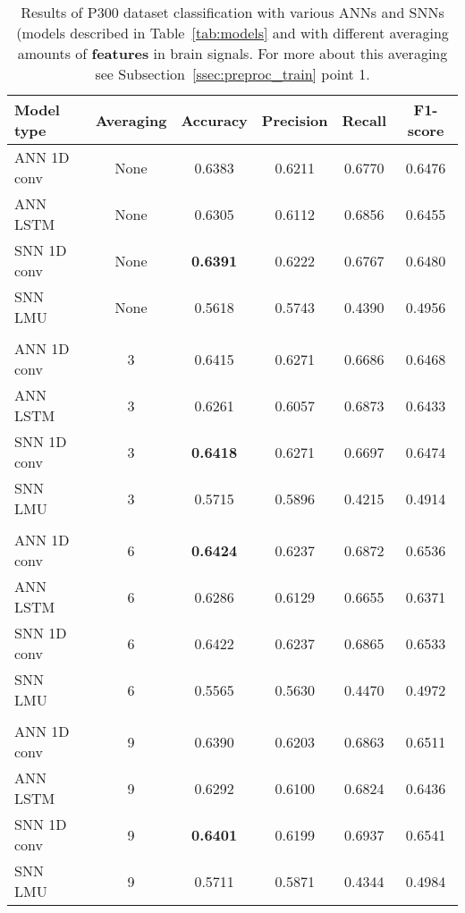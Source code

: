 \begin{table}[ht!]
	\centering
	\begin{tabular}{l c c c c c}
		\hline
		Model type & Averaging & Accuracy & Precision & Recall & F1-score \\
		\hline
		ANN 1D conv & None & 0.6383 & 0.6211 & 0.6770 & 0.6476 \\
		ANN LSTM    & None & 0.6305 & 0.6112 & 0.6856 & 0.6455 \\
		SNN 1D conv & None & \textbf{0.6391} & 0.6222 & 0.6767 & 0.6480 \\
		SNN LMU     & None & 0.5618 & 0.5743 & 0.4390 & 0.4956 \\
		\\
		ANN 1D conv & 3 & 0.6415 & 0.6271 & 0.6686 & 0.6468 \\
		ANN LSTM    & 3 & 0.6261 & 0.6057 & 0.6873 & 0.6433 \\
		SNN 1D conv & 3 & \textbf{0.6418} & 0.6271 & 0.6697 & 0.6474 \\
		SNN LMU     & 3 & 0.5715 & 0.5896 & 0.4215 & 0.4914 \\
		\\
		ANN 1D conv & 6 & \textbf{0.6424} & 0.6237 & 0.6872 & 0.6536 \\
		ANN LSTM    & 6 & 0.6286 & 0.6129 & 0.6655 & 0.6371 \\
		SNN 1D conv & 6 & 0.6422 & 0.6237 & 0.6865 & 0.6533 \\
		SNN LMU     & 6 & 0.5565 & 0.5630 & 0.4470 & 0.4972 \\
		\\
		ANN 1D conv & 9 & 0.6390 & 0.6203 & 0.6863 & 0.6511 \\
		ANN LSTM    & 9 & 0.6292 & 0.6100 & 0.6824 & 0.6436 \\
		SNN 1D conv & 9 & \textbf{0.6401} & 0.6199 & 0.6937 & 0.6541 \\
		SNN LMU     & 9 & 0.5711 & 0.5871 & 0.4344 & 0.4984 \\
		\hline
	\end{tabular}
	\caption{Results of P300 dataset classification with various ANNs and SNNs (models described in Table~\ref{tab:models} and with different averaging amounts of \textbf{features} in brain signals. For more about this averaging see Subsection~\ref{ssec:preproc_train} point 1.}
	\label{tab:results_signals}
\end{table}


